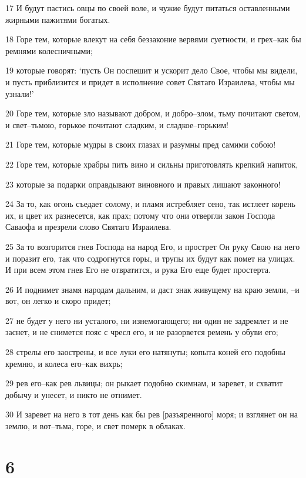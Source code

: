 \par 17 И будут пастись овцы по своей воле, и чужие будут питаться оставленными жирными пажитями богатых.
\par 18 Горе тем, которые влекут на себя беззаконие вервями суетности, и грех--как бы ремнями колесничными;
\par 19 которые говорят: `пусть Он поспешит и ускорит дело Свое, чтобы мы видели, и пусть приблизится и придет в исполнение совет Святаго Израилева, чтобы мы узнали!'
\par 20 Горе тем, которые зло называют добром, и добро--злом, тьму почитают светом, и свет--тьмою, горькое почитают сладким, и сладкое--горьким!
\par 21 Горе тем, которые мудры в своих глазах и разумны пред самими собою!
\par 22 Горе тем, которые храбры пить вино и сильны приготовлять крепкий напиток,
\par 23 которые за подарки оправдывают виновного и правых лишают законного!
\par 24 За то, как огонь съедает солому, и пламя истребляет сено, так истлеет корень их, и цвет их разнесется, как прах; потому что они отвергли закон Господа Саваофа и презрели слово Святаго Израилева.
\par 25 За то возгорится гнев Господа на народ Его, и прострет Он руку Свою на него и поразит его, так что содрогнутся горы, и трупы их будут как помет на улицах. И при всем этом гнев Его не отвратится, и рука Его еще будет простерта.
\par 26 И поднимет знамя народам дальним, и даст знак живущему на краю земли, --и вот, он легко и скоро придет;
\par 27 не будет у него ни усталого, ни изнемогающего; ни один не задремлет и не заснет, и не снимется пояс с чресл его, и не разорвется ремень у обуви его;
\par 28 стрелы его заострены, и все луки его натянуты; копыта коней его подобны кремню, и колеса его--как вихрь;
\par 29 рев его--как рев львицы; он рыкает подобно скимнам, и заревет, и схватит добычу и унесет, и никто не отнимет.
\par 30 И заревет на него в тот день как бы рев [разъяренного] моря; и взглянет он на землю, и вот--тьма, горе, и свет померк в облаках.

\chapter{6}

